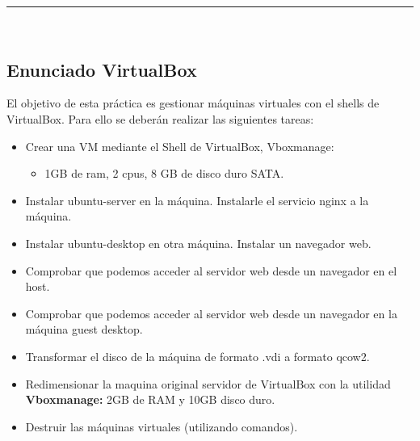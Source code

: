 \begin{center}
	{\fboxrule=4pt } \\
	\setcounter{section}{1}
	\setcounter{subsection}{0}
	\rule{15cm}{0pt} \\
\end{center}

\subsection{Enunciado VirtualBox}

\begin{ejer}
    \par El objetivo de esta práctica es gestionar máquinas virtuales con el shells de VirtualBox. 
	Para ello se deberán realizar las siguientes tareas:
	\begin{itemize}
		\item Crear una VM mediante el Shell de VirtualBox, Vboxmanage: 
		\begin{itemize}
			\item 1GB de ram, 2 cpus, 8 GB de disco duro SATA.
		\end{itemize}
		\item Instalar ubuntu-server en la máquina. Instalarle el servicio nginx a la máquina. 
		\item Instalar ubuntu-desktop en otra máquina. Instalar un navegador web. 
		\item Comprobar que podemos acceder al servidor web desde un navegador en el host.
		\item Comprobar que podemos acceder al servidor web desde un navegador en la máquina guest desktop.
		\item Transformar el disco de la máquina de formato .vdi a formato qcow2. 
		\item Redimensionar la maquina original servidor de VirtualBox con la utilidad \textbf{Vboxmanage:} 2GB de RAM y 10GB disco duro. 
		\item Destruir las máquinas virtuales (utilizando comandos).
	\end{itemize}
\end{ejer}



